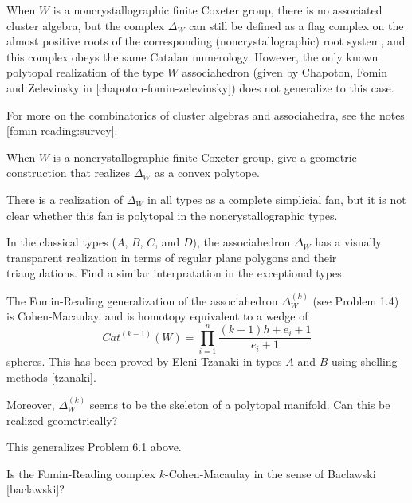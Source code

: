 \documentclass[12pt,letterpaper, reqno]{amsart}
\begin{document}
When $W$ is a noncrystallographic finite Coxeter group, there is no associated cluster algebra, but the complex $\Delta_W$ can still be defined as a flag complex on the almost positive roots of the corresponding (noncrystallographic) root system, and this complex obeys the same Catalan numerology. However, the only known polytopal realization of the type $W$ associahedron (given by Chapoton, Fomin and Zelevinsky in [chapoton-fomin-zelevinsky]) does not generalize to this case.

For more on the combinatorics of cluster algebras and associahedra, see the notes [fomin-reading:survey].

\begin{problemblock}
\begin{problem}[6.1]  When $W$ is a noncrystallographic finite Coxeter group, give a geometric construction that realizes $\Delta_W$ as a convex polytope. 
\end{problem}

\begin{distinguishedremark}
There is a realization of $\Delta_W$ in all types as a complete simplicial fan, but it is not clear whether this fan is polytopal in the noncrystallographic types.
\end{distinguishedremark}

\end{problemblock}

\begin{problemblock}
\begin{problem}[6.2] 
In the classical types ($A$, $B$, $C$, and $D$), the associahedron $\Delta_W$ has a visually transparent realization in terms of regular plane polygons and their triangulations. Find a similar interpratation in the exceptional types.
\end{problem}
\end{problemblock}



\begin{problemblock} 
\begin{conjecture}[6.3]   The Fomin-Reading generalization of the associahedron $\Delta_W^{(k)}$ (see Problem 1.4) is Cohen-Macaulay, and is homotopy equivalent to a wedge of 
$$
Cat^{(k-1)}(W)=\prod_{i=1}^n \frac{(k-1)h +e_i +1}{e_i+1}
$$
spheres. This has been proved by Eleni Tzanaki in types $A$ and $B$  using shelling methods [tzanaki].

Moreover, $\Delta_W^{(k)}$ seems to be the skeleton of a polytopal manifold. Can this be realized geometrically?
\end{conjecture}

\begin{remark}
This generalizes Problem 6.1 above.
\end{remark}

\begin{remark}
Is the Fomin-Reading complex $k$-Cohen-Macaulay in the sense of Baclawski [baclawski]?
\end{remark}
\end{problemblock}
\end{document}
